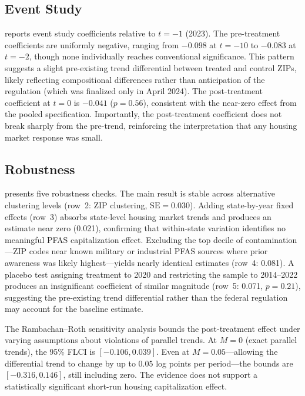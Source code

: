 \documentclass[12pt]{article}
\begin{document}
\subsection{Event Study}



 reports event study coefficients relative to $t = -1$ (2023). The pre-treatment coefficients are uniformly negative, ranging from $-0.098$ at $t = -10$ to $-0.083$ at $t = -2$, though none individually reaches conventional significance. This pattern suggests a slight pre-existing trend differential between treated and control ZIPs, likely reflecting compositional differences rather than anticipation of the regulation (which was finalized only in April 2024). The post-treatment coefficient at $t = 0$ is $-0.041$ ($p = 0.56$), consistent with the near-zero effect from the pooled specification. Importantly, the post-treatment coefficient does not break sharply from the pre-trend, reinforcing the interpretation that any housing market response was small.

\subsection{Robustness}



 presents five robustness checks. The main result is stable across alternative clustering levels (row~2: ZIP clustering, $\text{SE} = 0.030$). Adding state-by-year fixed effects (row~3) absorbs state-level housing market trends and produces an estimate near zero (0.021), confirming that within-state variation identifies no meaningful PFAS capitalization effect. Excluding the top decile of contamination---ZIP codes near known military or industrial PFAS sources where prior awareness was likely highest---yields nearly identical estimates (row~4: 0.081). A placebo test assigning treatment to 2020 and restricting the sample to 2014--2022 produces an insignificant coefficient of similar magnitude (row~5: 0.071, $p = 0.21$), suggesting the pre-existing trend differential rather than the federal regulation may account for the baseline estimate.

The Rambachan--Roth sensitivity analysis bounds the post-treatment effect under varying assumptions about violations of parallel trends. At $M = 0$ (exact parallel trends), the 95\% FLCI is $[-0.106, 0.039]$. Even at $M = 0.05$---allowing the differential trend to change by up to 0.05 log points per period---the bounds are $[-0.316, 0.146]$, still including zero. The evidence does not support a statistically significant short-run housing capitalization effect.
\end{document}
